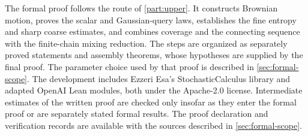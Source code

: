{The formal proof follows the route of \cref{part:upper}. It constructs
Brownian motion, proves the scalar and Gaussian-query laws, establishes
the fine entropy and sharp coarse estimates, and combines coverage and
the connecting sequence with the finite-chain mixing reduction. The
steps are organized as separately proved statements and assembly
theorems, whose hypotheses are supplied by the final proof. The
parameter choice used by that proof is described in
\cref{sec:formal-scope}. The development includes Ezzeri Esa's
StochasticCalculus library and adapted OpenAI Lean modules, both under
the Apache-2.0 license. Intermediate estimates of the written proof are
checked only insofar as they enter the formal proof or are separately
stated formal results.
\else
The proof declaration and verification records are available with the
sources described in \cref{sec:formal-scope}.
\fi}

\newcommand{\statusFormalUpperScope}{
\ifupperformal
\Cref{cor:upper-discrete,cor:two-sided} are not separately formalized.
The development proves admissibility of the affine family in
\cref{u:prop:range} throughout
$0<\varepsilon_\omega<1/80$, including the choice
$\varepsilon_\omega=(1/4-\omega)/20$. The final proof of
\cref{thm:upper} instead uses the same affine family at
$\min\{1/2000,(1/4-\omega)/20\}$ and proves the target for every
$\omega\in(0,1/4)$. A separate formal result characterizes the open
range of the development's strict estimate system, and another checks
an explicit rational instance. The ancillary calculation described
after \cref{u:prop:range}, including every identity for
\cref{u:tab:budget}, is not a separately certified formal statement.
\else
The scope of the upper-bound verification is recorded with the sources
described below.
\fi}
